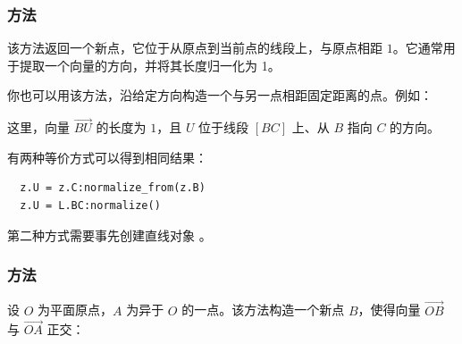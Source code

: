 \subsubsection{方法 }
\label{ssub:method_normalize}

该方法返回一个新点，它位于从原点到当前点的线段上，与原点相距 $1$。它通常用于提取一个向量的方向，并将其长度归一化为 1。

\medskip

你也可以用该方法，沿给定方向构造一个与另一点相距固定距离的点。例如：

\begin{center}
\end{center}


这里，向量 $\overrightarrow{BU}$ 的长度为 $1$，且 $U$ 位于线段 $[BC]$ 上、从 $B$ 指向 $C$ 的方向。

\medskip

有两种等价方式可以得到相同结果：

\begin{mybox}
\begin{verbatim}
  z.U = z.C:normalize_from(z.B)
  z.U = L.BC:normalize()
\end{verbatim}
\end{mybox}


第二种方式需要事先创建直线对象 。

\vspace{1em}

\begin{tkzexample}[latex=8cm]
\end{tkzexample}

\subsubsection{方法 }
\label{ssub:orthogonal_method}

设 $O$ 为平面原点，$A$ 为异于 $O$ 的一点。该方法构造一个新点 $B$，使得向量 $\overrightarrow{OB}$ 与 $\overrightarrow{OA}$ 正交：

